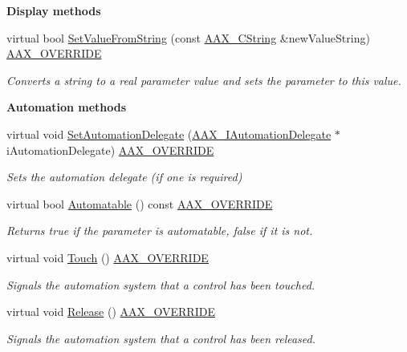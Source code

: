 \begin{Indent}{\bf Display methods}
\begin{DoxyCompactItemize}
virtual bool \hyperlink{a00033_aa9194daefda8f6491849819fb25a73d2}{Set\+Value\+From\+String} (const \hyperlink{a00042}{A\+A\+X\+\_\+\+C\+String} \&new\+Value\+String) \hyperlink{a00149_ac2f24a5172689ae684344abdcce55463}{A\+A\+X\+\_\+\+O\+V\+E\+R\+R\+I\+D\+E}
\begin{DoxyCompactList}\small\item\em Converts a string to a real parameter value and sets the parameter to this value. \end{DoxyCompactList}\end{DoxyCompactItemize}
\end{Indent}
\begin{Indent}{\bf Automation methods}\par
\begin{DoxyCompactItemize}
\item 
virtual void \hyperlink{a00033_aceb34aeadaca054f318004d49a0bd5b7}{Set\+Automation\+Delegate} (\hyperlink{a00086}{A\+A\+X\+\_\+\+I\+Automation\+Delegate} $\ast$i\+Automation\+Delegate) \hyperlink{a00149_ac2f24a5172689ae684344abdcce55463}{A\+A\+X\+\_\+\+O\+V\+E\+R\+R\+I\+D\+E}
\begin{DoxyCompactList}\small\item\em Sets the automation delegate (if one is required) \end{DoxyCompactList}\item 
virtual bool \hyperlink{a00033_aebb304bbabf739d5019bd6372e8928d7}{Automatable} () const \hyperlink{a00149_ac2f24a5172689ae684344abdcce55463}{A\+A\+X\+\_\+\+O\+V\+E\+R\+R\+I\+D\+E}
\begin{DoxyCompactList}\small\item\em Returns true if the parameter is automatable, false if it is not. \end{DoxyCompactList}\item 
virtual void \hyperlink{a00033_afb023dec89c366c2f5667c2a225b1df9}{Touch} () \hyperlink{a00149_ac2f24a5172689ae684344abdcce55463}{A\+A\+X\+\_\+\+O\+V\+E\+R\+R\+I\+D\+E}
\begin{DoxyCompactList}\small\item\em Signals the automation system that a control has been touched. \end{DoxyCompactList}\item 
virtual void \hyperlink{a00033_a52d73a61f7b7cdc7125e76617883f3fd}{Release} () \hyperlink{a00149_ac2f24a5172689ae684344abdcce55463}{A\+A\+X\+\_\+\+O\+V\+E\+R\+R\+I\+D\+E}
\begin{DoxyCompactList}\small\item\em Signals the automation system that a control has been released. \end{DoxyCompactList}\end{DoxyCompactItemize}
\end{Indent}
